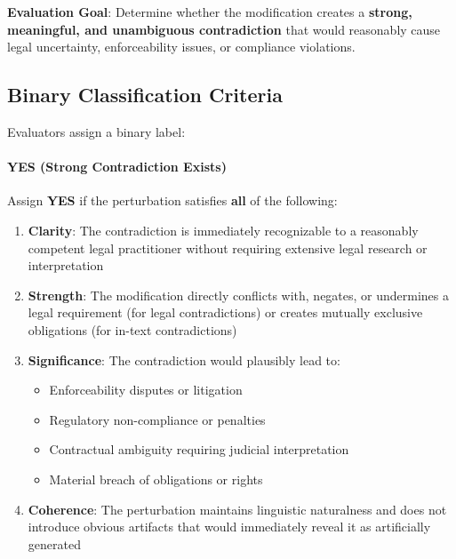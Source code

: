 \documentclass[11pt]{article}
\begin{document}
\textbf{Evaluation Goal}: Determine whether the modification creates a \textbf{strong, meaningful, and unambiguous contradiction} that would reasonably cause legal uncertainty, enforceability issues, or compliance violations.

\subsection{Binary Classification Criteria}

Evaluators assign a binary label:

\paragraph{YES (Strong Contradiction Exists)} Assign \textbf{YES} if the perturbation satisfies \textbf{all} of the following:
\begin{enumerate}[leftmargin=*,itemsep=0.1em]
    \item \textbf{Clarity}: The contradiction is immediately recognizable to a reasonably competent legal practitioner without requiring extensive legal research or interpretation
    \item \textbf{Strength}: The modification directly conflicts with, negates, or undermines a legal requirement (for legal contradictions) or creates mutually exclusive obligations (for in-text contradictions)
    \item \textbf{Significance}: The contradiction would plausibly lead to:
    \begin{itemize}
        \item Enforceability disputes or litigation
        \item Regulatory non-compliance or penalties
        \item Contractual ambiguity requiring judicial interpretation
        \item Material breach of obligations or rights
    \end{itemize}
    \item \textbf{Coherence}: The perturbation maintains linguistic naturalness and does not introduce obvious artifacts that would immediately reveal it as artificially generated
\end{enumerate}
\end{document}
